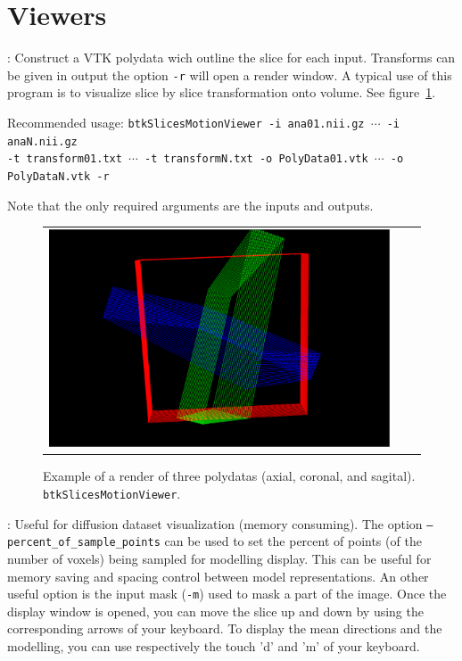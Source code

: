\newpage
\section{Viewers}
\label{sec:viewers}

\begin{description}
\item[btkSlicesMotionViewer]: Construct a VTK polydata wich outline the slice for each input. Transforms can be given in output the option \texttt{-r} will open a render window.
A typical use of this program is to visualize slice by slice transformation onto volume. See figure~\ref{fig:btkSlicesMotionViewer}.

Recommended usage: \texttt{btkSlicesMotionViewer -i ana01.nii.gz $\cdots$ -i anaN.nii.gz \\
-t transform01.txt $\cdots$ -t transformN.txt -o PolyData01.vtk $\cdots$ -o PolyDataN.vtk -r }

Note that the only required arguments are the inputs and outputs.

\begin{figure}[t]
\centering
\begin{tabular}{ccc}
\includegraphics[width=0.5\columnwidth]{btkSlicesMotionViewer.eps}
\end{tabular}
\caption{Example of a render of three polydatas (axial, coronal, and sagital).
\texttt{btkSlicesMotionViewer}.}
\label{fig:btkSlicesMotionViewer}
\end{figure}

\item[btkDiffusionViewer]: Useful for diffusion dataset visualization (memory consuming). The option \texttt{--percent\_of\_sample\_points} can be used to set the percent of points (of the number of voxels) being sampled for modelling display. This can be useful for memory saving and spacing control between model representations. An other useful option is the input mask (\texttt{-m}) used to mask a part of the image.
Once the display window is opened, you can move the slice up and down by using the corresponding arrows of your keyboard. To display the mean directions and the modelling, you can use respectively the touch 'd' and 'm' of your keyboard.

\end{description}

